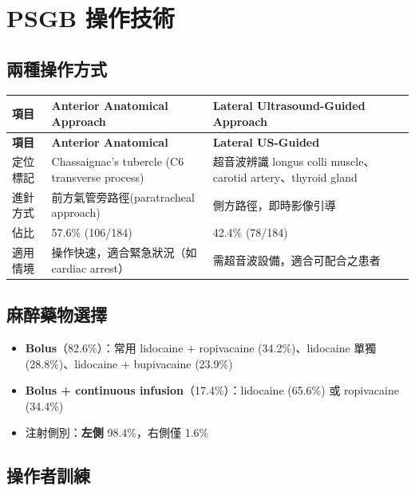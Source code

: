 \documentclass[12pt,a4paper]{article}
\begin{document}
\section{PSGB 操作技術}

\subsection{兩種操作方式}

\begin{longtable}{p{3cm}p{5cm}p{5.5cm}}
\toprule
\textbf{項目} & \textbf{Anterior Anatomical Approach} & \textbf{Lateral Ultrasound-Guided Approach} \\
\midrule
\endfirsthead

\toprule
\textbf{項目} & \textbf{Anterior Anatomical} & \textbf{Lateral US-Guided} \\
\midrule
\endhead

\bottomrule
\endfoot

定位標記 & Chassaignac's tubercle (C6 transverse process) & 超音波辨識 longus colli muscle、carotid artery、thyroid gland \\
\midrule
進針方式 & 前方氣管旁路徑\newline (paratracheal approach) & 側方路徑，即時影像引導 \\
\midrule
佔比 & 57.6\% (106/184) & 42.4\% (78/184) \\
\midrule
適用情境 & 操作快速，適合緊急狀況（如 cardiac arrest） & 需超音波設備，適合可配合之患者 \\
\bottomrule
\end{longtable}

\subsection{麻醉藥物選擇}

\begin{itemize}
    \item \textbf{Bolus}（82.6\%）：常用 lidocaine + ropivacaine (34.2\%)、lidocaine 單獨 (28.8\%)、lidocaine + bupivacaine (23.9\%)
    \item \textbf{Bolus + continuous infusion}（17.4\%）：lidocaine (65.6\%) 或 ropivacaine (34.4\%)
    \item 注射側別：\textbf{左側} 98.4\%，右側僅 1.6\%
\end{itemize}

\subsection{操作者訓練}
\end{document}
